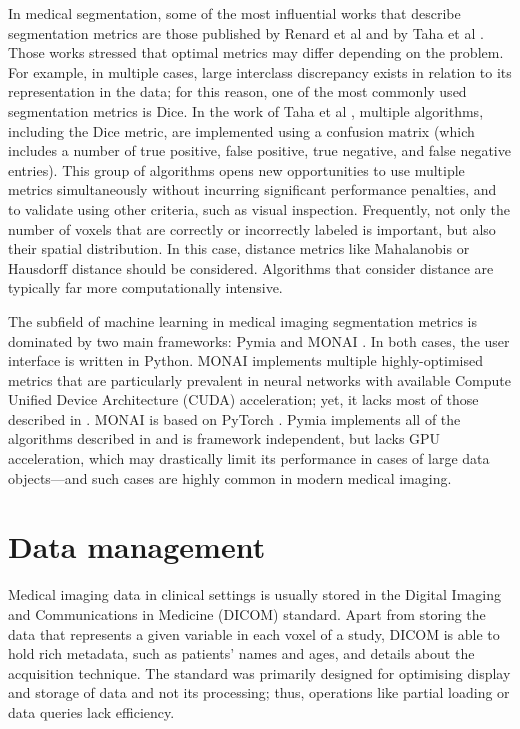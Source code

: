 \documentclass{juliacon}
\begin{document}
In medical segmentation, some of the most influential works that describe segmentation metrics are those published by Renard et al \cite{Nature} and by Taha et al \cite{TahaMainSegm}. Those works stressed that optimal metrics may differ depending on the problem. For example, in multiple cases, large interclass discrepancy exists in relation to its representation in the data; for this reason, one of the most commonly used segmentation metrics is Dice. In the work of Taha et al \cite{TahaMainSegm}, multiple algorithms, including the Dice metric, are implemented using a confusion matrix (which includes a number of true positive, false positive, true negative, and false negative entries). This group of algorithms opens new opportunities to use multiple metrics simultaneously without incurring significant performance penalties, and to validate using other criteria, such as visual inspection. Frequently, not only the number of voxels that are correctly or incorrectly labeled is important, but also their spatial distribution. In this case, distance metrics like Mahalanobis or Hausdorff distance should be considered. Algorithms that consider distance are typically far more computationally intensive.

The subfield of machine learning in medical imaging segmentation metrics is dominated by two main frameworks: Pymia \cite{Pymia} and MONAI \cite{MONAI}. In both cases, the user interface is written in Python. MONAI \cite{MONAI} implements multiple  highly-optimised metrics that are particularly prevalent in neural networks with available Compute Unified Device Architecture (CUDA) acceleration; yet, it lacks most of those described in \cite{TahaMainSegm}. MONAI is  based on PyTorch \cite{pytorch}. Pymia \cite{Pymia} implements all of the algorithms described in \cite{TahaMainSegm} and is framework independent, but lacks GPU acceleration, which may drastically limit its performance in cases of large data objects---and such cases are highly common in modern medical imaging. 


\section{Data management}
Medical imaging data in clinical settings is usually stored in the Digital Imaging and Communications in Medicine (DICOM) \cite{dicom} standard. Apart from storing the data that represents a given variable in each voxel of a study, DICOM is able to hold rich metadata, such as patients' names and ages, and details about the acquisition technique.  The standard was primarily designed for optimising display and storage of data and not its processing; thus, operations like partial loading or data queries lack efficiency.
\end{document}
